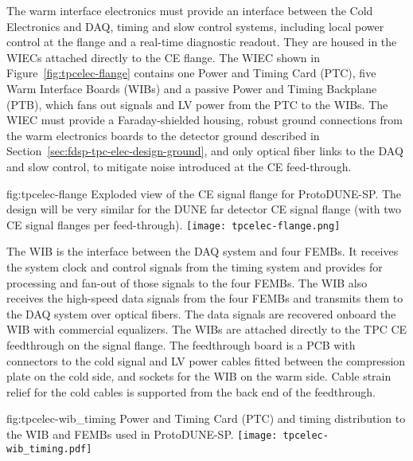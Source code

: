 The warm interface electronics must provide an interface between the Cold Electronics and DAQ, timing and slow control systems, including local power control at the flange and a real-time diagnostic readout. They are housed in the WIECs attached directly to the CE flange.  The WIEC shown in Figure~\ref{fig:tpcelec-flange} 
contains one
Power and Timing Card (PTC), five Warm Interface Boards (WIBs) and a passive
Power and Timing Backplane (PTB), which fans out signals and LV power from the PTC to the WIBs. The WIEC must provide a Faraday-shielded housing, robust ground connections from the warm electronics boards to the detector ground described in Section~\ref{sec:fdsp-tpc-elec-design-ground}, and only optical fiber links to the DAQ and slow control, to mitigate noise introduced at the CE feed-through.

\begin{dunefigure}
{fig:tpcelec-flange}
{Exploded view of the CE signal flange for ProtoDUNE-SP.  The design will be very similar for the DUNE far detector CE signal flange (with two CE signal flanges per feed-through).}
\texttt{[image: tpcelec-flange.png]}
\end{dunefigure}

The WIB is the interface between the
DAQ system and four
FEMBs. It receives the system clock and control signals from the
timing system and provides for processing and fan-out of those signals to the four
FEMBs. The WIB also receives the high-speed data signals from the four 
FEMBs and transmits them to the DAQ system over optical
fibers. The data signals are recovered onboard the WIB with commercial equalizers.
The WIBs are attached directly to the TPC
CE feedthrough on the signal flange. The feedthrough
board is a PCB with connectors to the cold signal and LV power cables fitted
between the compression plate on the cold side, and sockets for
the WIB on the warm side. Cable strain relief for the cold cables is 
supported from the back end of the feedthrough.

\begin{dunefigure}
{fig:tpcelec-wib_timing}
{Power and Timing Card (PTC) and timing distribution to the WIB and FEMBs used in ProtoDUNE-SP.}
\texttt{[image: tpcelec-wib\_timing.pdf]}
\end{dunefigure}


